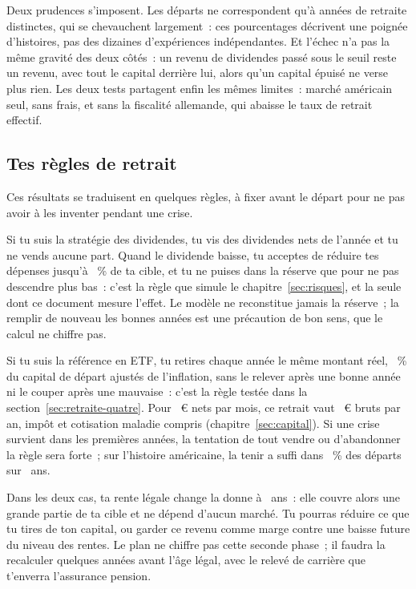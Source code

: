 Deux prudences s'imposent. Les \RetraitHistMemesDepartsJuges{} d\'eparts ne correspondent qu'\`a
\RetraitHistMemesDepartsAnnees{} ann\'ees de retraite distinctes, qui se chevauchent largement~: ces
pourcentages d\'ecrivent une poign\'ee d'histoires, pas des dizaines d'exp\'eriences ind\'ependantes.
Et l'\'echec n'a pas la m\^eme gravit\'e des deux c\^ot\'es~: un revenu de dividendes pass\'e sous le
seuil reste un revenu, avec tout le capital derri\`ere lui, alors qu'un capital \'epuis\'e ne verse plus
rien. Les deux tests partagent enfin les m\^emes limites~: march\'e am\'ericain seul, sans frais, et
sans la fiscalit\'e allemande, qui abaisse le taux de retrait effectif.

\subsection{Tes r\`egles de retrait}\label{sec:retraite-regles}

Ces r\'esultats se traduisent en quelques r\`egles, \`a fixer avant le d\'epart pour ne pas avoir \`a
les inventer pendant une crise.

Si tu suis la strat\'egie des dividendes, tu vis des dividendes nets de l'ann\'ee et tu ne vends
aucune part. Quand le dividende baisse, tu acceptes de r\'eduire tes d\'epenses jusqu'\`a
\SeuilReussite~\% de ta cible, et tu ne puises dans la r\'eserve que pour ne pas descendre plus
bas~: c'est la r\`egle que simule le chapitre~\ref{sec:risques}, et la seule dont ce document mesure
l'effet. Le mod\`ele ne reconstitue jamais la r\'eserve~; la remplir de nouveau les bonnes ann\'ees
est une pr\'ecaution de bon sens, que le calcul ne chiffre pas.

Si tu suis la r\'ef\'erence en ETF, tu retires chaque ann\'ee le m\^eme montant r\'eel,
\TauxRetrait~\% du capital de d\'epart ajust\'es de l'inflation, sans le relever apr\`es une bonne
ann\'ee ni le couper apr\`es une mauvaise~: c'est la r\`egle test\'ee dans la
section~\ref{sec:retraite-quatre}. Pour \ZielMonat~€ nets par mois, ce retrait vaut
\RetraitBrutEtf~€ bruts par an, imp\^ot et cotisation maladie compris (chapitre~\ref{sec:capital}).
Si une crise survient dans les premi\`eres ann\'ees, la tentation de tout vendre ou d'abandonner la
r\`egle sera forte~; sur l'histoire am\'ericaine, la tenir a suffi dans \RetraitHistReussiteVierzig~\%
des d\'eparts sur \RetraitHistAnsVierzig~ans.

Dans les deux cas, ta rente l\'egale change la donne \`a \AgeLegal~ans~: elle couvre alors une grande
partie de ta cible et ne d\'epend d'aucun march\'e. Tu pourras r\'eduire ce que tu tires de ton
capital, ou garder ce revenu comme marge contre une baisse future du niveau des rentes. Le plan ne
chiffre pas cette seconde phase~; il faudra la recalculer quelques ann\'ees avant l'\^age l\'egal,
avec le relev\'e de carri\`ere que t'enverra l'assurance pension.

